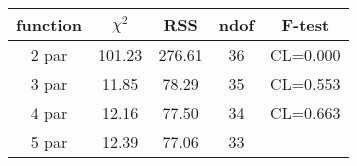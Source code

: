 \begin{tabular}{c|c|c|c|c}
function & $\chi^2$ & RSS & ndof & F-test \\
\hline
2 par & 101.23 & 276.61 & 36 & CL=0.000 \\
3 par & 11.85 & 78.29 & 35 & CL=0.553 \\
4 par & 12.16 & 77.50 & 34 & CL=0.663 \\
5 par & 12.39 & 77.06 & 33 & \\
\hline
\end{tabular}
